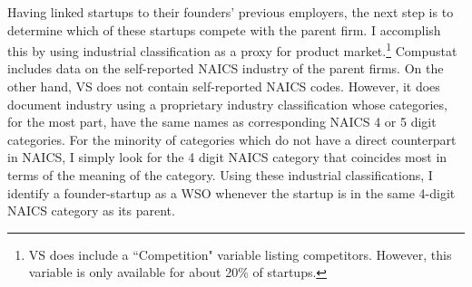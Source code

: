 \documentclass[ecta,nameyear,final]{econsocart}
\theoremstyle{plain}
\theoremstyle{remark}
\begin{document}


Having linked startups to their founders' previous employers, the next step is to determine which of these startups compete with the parent firm. I accomplish this by using industrial classification as a proxy for product market.\footnote{VS does include a ``Competition" variable listing competitors. However, this variable is only available for about 20\% of startups.} Compustat includes data on the self-reported NAICS industry of the parent firms. On the other hand, VS does not contain self-reported NAICS codes. However, it does document industry using a proprietary industry classification whose categories, for the most part, have the same names as corresponding NAICS 4 or 5 digit categories. For the minority of categories which do not have a direct counterpart in NAICS, I simply look for the 4 digit NAICS category that coincides most in terms of the meaning of the category. Using these industrial classifications, I identify a founder-startup as a WSO whenever the startup is in the same 4-digit NAICS category as its parent. 
\end{document}
